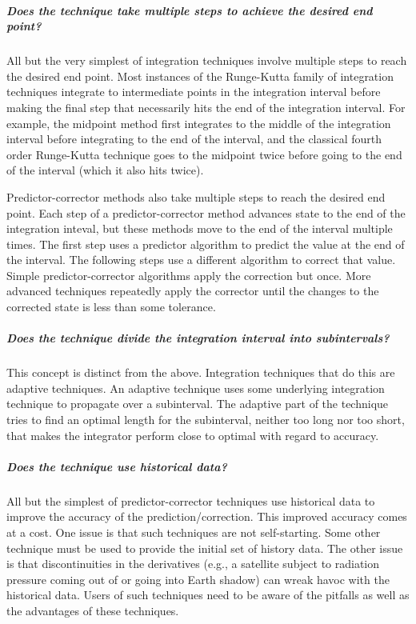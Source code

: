 \subparagraph{%
Does the technique take multiple steps to achieve the desired end point?}
\leavevmode\newline
All but the very simplest of integration techniques involve multiple steps to
reach the desired end point.
Most instances of the Runge-Kutta family of integration techniques integrate
to intermediate points in the integration interval before making the final
step that necessarily hits the end of the integration interval. For example,
the midpoint method first integrates to the middle of the integration interval
before integrating to the end of the interval, and the classical fourth order
Runge-Kutta technique goes to the midpoint twice before going to the end
of the interval (which it also hits twice).

Predictor-corrector methods also take multiple steps to reach the desired
end point. Each step of a predictor-corrector method advances state to the
end of the integration inteval, but these methods move to the end of the
interval multiple times. The first step uses a predictor algorithm to predict
the value at the end of the interval. The following steps use a different
algorithm to correct that value. Simple predictor-corrector algorithms
apply the correction but once. More advanced techniques repeatedly apply the
corrector until the changes to the corrected state is less than some tolerance.

\subparagraph{%
Does the technique divide the integration interval into subintervals?}
\leavevmode\newline
This concept is distinct from the above.
Integration techniques that do this are adaptive techniques.
An adaptive technique uses some underlying integration technique to propagate
over a subinterval. The adaptive part of the technique tries to find an
optimal length for the subinterval, neither too long nor too short, that
makes the integrator perform close to optimal with regard to accuracy.

\subparagraph{Does the technique use historical data?}
\leavevmode\newline
All but the simplest of predictor-corrector techniques use historical data
to improve the accuracy of the prediction/correction. This improved accuracy
comes at a cost. One issue is that such techniques are not self-starting. Some
other technique must be used to provide the initial set of history data.
The other issue is that discontinuities in the derivatives (e.g., a satellite
subject to radiation pressure coming out of or going into Earth shadow)
can wreak havoc with the historical data. Users of such techniques need
to be aware of the pitfalls as well as the advantages of these techniques.

